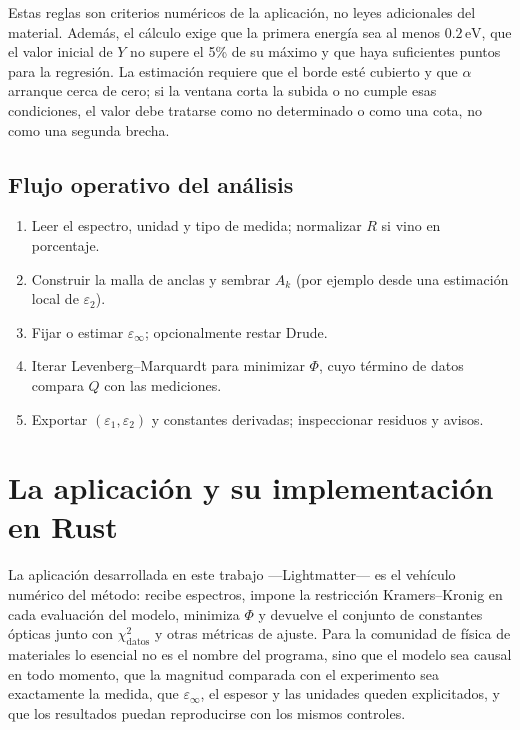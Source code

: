 Estas reglas son criterios num\'ericos de la aplicaci\'on, no leyes adicionales del material. Adem\'as, el c\'alculo exige que la primera energ\'ia sea al menos $0.2\,\mathrm{eV}$, que el valor inicial de $Y$ no supere el 5\% de su m\'aximo y que haya suficientes puntos para la regresi\'on. La estimaci\'on requiere que el borde est\'e cubierto y que $\alpha$ arranque cerca de cero; si la ventana corta la subida o no cumple esas condiciones, el valor debe tratarse como no determinado o como una cota, no como una segunda brecha.

\section{Flujo operativo del an\'alisis}

\begin{enumerate}[leftmargin=*]
\item Leer el espectro, unidad y tipo de medida; normalizar $R$ si vino en porcentaje.
\item Construir la malla de anclas y sembrar $A_k$ (por ejemplo desde una estimaci\'on local de $\varepsilon_2$).
\item Fijar o estimar $\varepsilon_\infty$; opcionalmente restar Drude.
\item Iterar Levenberg--Marquardt para minimizar $\Phi$, cuyo t\'ermino de datos compara $Q$ con las mediciones.
\item Exportar $(\varepsilon_1,\varepsilon_2)$ y constantes derivadas; inspeccionar residuos y avisos.
\end{enumerate}


\chapter{La aplicaci\'on y su implementaci\'on en Rust}
\label{ch:app}

La aplicaci\'on desarrollada en este trabajo ---Lightmatter--- es el veh\'iculo num\'erico del m\'etodo: recibe espectros, impone la restricci\'on Kramers--Kronig en cada evaluaci\'on del modelo, minimiza $\Phi$ y devuelve el conjunto de constantes \'opticas junto con $\chi^{2}_{\mathrm{datos}}$ y otras m\'etricas de ajuste.
Para la comunidad de f\'isica de materiales lo esencial no es el nombre del programa, sino que el modelo sea causal en todo momento, que la magnitud comparada con el experimento sea exactamente la medida, que $\varepsilon_\infty$, el espesor y las unidades queden explicitados, y que los resultados puedan reproducirse con los mismos controles.

